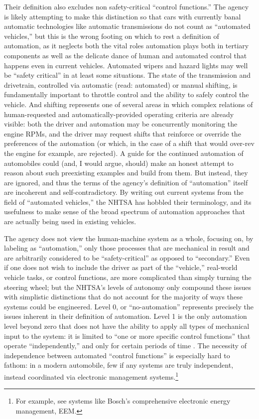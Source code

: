 Their definition also excludes non safety-critical ``control
functions.'' The agency is likely attempting to make this distinction
so that cars with currently banal automatic technologies like
automatic transmissions do 
not count as ``automated vehicles,'' but this is the wrong footing on
which to rest a definition of automation, as it neglects both the
vital roles automation plays both in tertiary components as well as
the delicate dance of human and automated control that happens even in
current vehicles. Automated wipers and hazard
lights may well be ``safety critical'' in at least some situations.
The state of the transmission 
and drivetrain, controlled via automatic (read: automated) or manual
shifting, is fundamentally important to throttle control and the
ability to safely control the vehicle. And shifting represents one of
several areas
in which complex relations of human-requested and
automatically-provided operating criteria are already visible: both
the driver and automation may be concurrently monitoring the engine
RPMs, and the driver may request shifts that reinforce or override the
preferences of the automation (or which, in the case of a shift that would
over-rev the engine for example, are rejected). A guide for the
continued automation of automobiles could (and, I would argue, should)
make an honest attempt to reason about such preexisting examples and
build from them. But instead, they are ignored, and thus the
terms of the agency's definition of ``automation'' itself are incoherent
and self-contradictory. By writing out current systems from the field
of ``automated vehicles,'' the NHTSA has hobbled their terminology,
and its usefulness to make sense of the broad spectrum of automation
approaches that are actually being used in existing vehicles.

The agency does not view the human-machine system as a whole, focusing
on, by labeling as ``automation,'' only those processes that are
mechanical in result and are arbitrarily considered to be
``safety-critical'' as opposed to ``secondary.'' Even if one does not
wish to include 
the driver as part of the ``vehicle,'' real-world vehicle tasks, or
control functions, are more complicated than simply turning the
steering wheel; but the NHTSA's levels of autonomy only compound these
issues with simplistic distinctions that do not account for the
majority of ways these systems could be engineered. Level 0, or
``no-automation'' represents 
precisely the issues inherent in their definition of automation. Level
1 is the only automation level beyond zero that does not have the
ability to apply all types of mechanical input to the system: it is
limited to ``one or more specific control functions'' that operate
``independently,'' and only for certain periods of time \cite[p. 4]{NHTSA}. The
necessity of independence between automated ``control functions'' is
especially hard to fathom: in a modern automobile, few if any systems
are truly independent, instead coordinated via electronic management
systems.\footnote{For example, see systems like Bosch's comprehensive
  electronic energy management, EEM.} 

